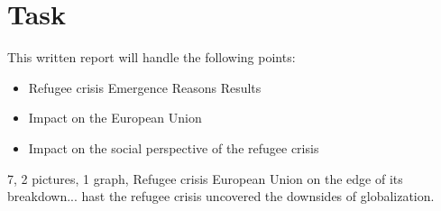 
\section{Task}

This written report will handle the following points:
\begin{itemize}
	\item Refugee crisis
		\subitem Emergence
		\subitem Reasons
		\subitem Results
	\item Impact on the European Union
	\item Impact on the social perspective of the refugee crisis
\end{itemize}
7, 2 pictures, 1 graph, 	
Refugee crisis European Union on the edge of its breakdown... hast the refugee crisis uncovered the downsides of globalization.

\clearpage

